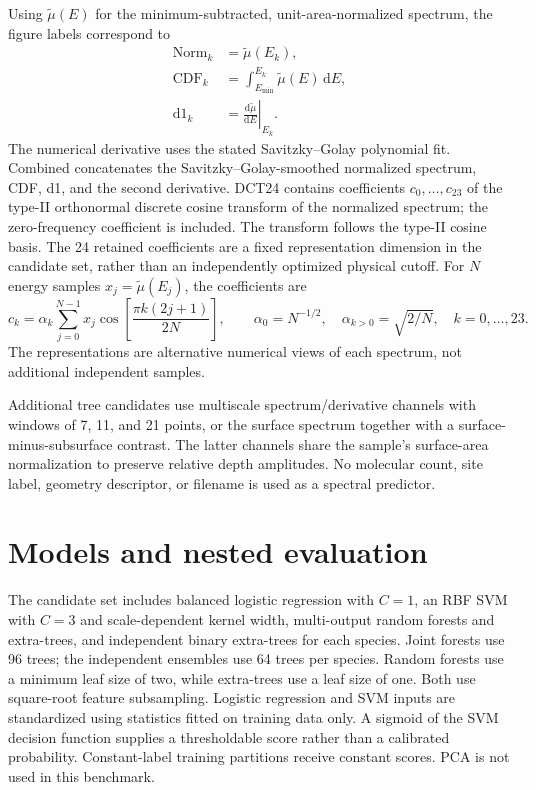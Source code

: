 \documentclass[11pt,a4paper]{article}
\begin{document}
Using $\widetilde\mu(E)$ for the minimum-subtracted, unit-area-normalized spectrum, the figure labels correspond to
\begin{align}
\mathrm{Norm}_k &= \widetilde\mu(E_k),\\
\mathrm{CDF}_k &= \int_{E_{\min}}^{E_k}\widetilde\mu(E)\,\mathrm dE,\\
\mathrm{d1}_k &= \left.\frac{\mathrm d\widetilde\mu}{\mathrm dE}\right|_{E_k}.
\end{align}
The numerical derivative uses the stated Savitzky--Golay polynomial fit. Combined concatenates the Savitzky--Golay-smoothed normalized spectrum, CDF, d1, and the second derivative. DCT24 contains coefficients $c_0,\ldots,c_{23}$ of the type-II orthonormal discrete cosine transform of the normalized spectrum; the zero-frequency coefficient is included. The transform follows the type-II cosine basis.\cite{ahmed1974} The 24 retained coefficients are a fixed representation dimension in the candidate set, rather than an independently optimized physical cutoff. For $N$ energy samples $x_j=\widetilde\mu(E_j)$, the coefficients are \begin{equation}
c_k=\alpha_k\sum_{j=0}^{N-1}x_j\cos\!\left[\frac{\pi k(2j+1)}{2N}\right],\qquad
\alpha_0=N^{-1/2},\quad \alpha_{k>0}=\sqrt{2/N},\quad k=0,\ldots,23.
\end{equation}
The representations are alternative numerical views of each spectrum, not additional independent samples.


Additional tree candidates use multiscale spectrum/derivative channels with windows of 7, 11, and 21 points, or the surface spectrum together with a surface-minus-subsurface contrast. The latter channels share the sample's surface-area normalization to preserve relative depth amplitudes. No molecular count, site label, geometry descriptor, or filename is used as a spectral predictor.

\section{Models and nested evaluation}
The candidate set includes balanced logistic regression with $C=1$, an RBF SVM with $C=3$ and scale-dependent kernel width, multi-output random forests and extra-trees, and independent binary extra-trees for each species.\cite{geurts2006} Joint forests use 96 trees; the independent ensembles use 64 trees per species. Random forests use a minimum leaf size of two, while extra-trees use a leaf size of one. Both use square-root feature subsampling. Logistic regression and SVM inputs are standardized using statistics fitted on training data only. A sigmoid of the SVM decision function supplies a thresholdable score rather than a calibrated probability. Constant-label training partitions receive constant scores. PCA is not used in this benchmark.
\end{document}
